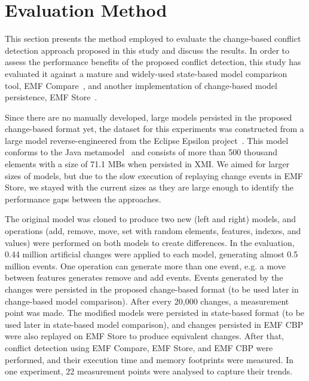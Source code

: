 \section{Evaluation Method}
\label{sec:evaluation_method}
This section presents the method employed to evaluate the change-based conflict detection approach proposed in this study and discuss the results. In order to assess the performance benefits of the proposed conflict detection, this study has evaluated it against a mature and widely-used state-based model comparison tool, EMF Compare~\cite{emfcompare2018developer,eclipse2017compare}, and another implementation of change-based model persistence, EMF Store~\cite{koegel2010emfstore}.

Since there are no manually developed, large models persisted in the proposed change-based format yet, the dataset for this experiments was constructed from a large model reverse-engineered from the Eclipse Epsilon project~\cite{eclipse2018epsilongit,eclipse2017epsilon}. This model conforms to the Java metamodel~\cite{eclipse2018modiscojava} and consists of more than 500 thousand elements with a size of 71.1 MBs when persisted in XMI. We aimed for larger sizes of models, but due to the slow execution of replaying change events in EMF Store, we stayed with the current sizes as they are large enough to identify the performance gaps between the approaches.

The original model was cloned to produce two new (left and right) models, and operations (\textsf{add}, \textsf{remove}, \textsf{move}, \textsf{set} with random elements, features, indexes, and values) were performed on both models to create differences. In the evaluation, 0.44 million artificial changes were applied to each model, generating almost 0.5 million events. One operation can generate more than one event, e.g. a \textsf{move} between features generates \textsf{remove} and \textsf{add} events. Events generated by the changes were persisted in the proposed change-based format (to be used later in change-based model comparison). After every 20,000 changes, a measurement point was made. The modified models were persisted in state-based format (to be used later in state-based model comparison), and changes persisted in EMF CBP were also replayed on EMF Store to produce equivalent changes. After that, conflict detection using EMF Compare, EMF Store, and EMF CBP were performed, and their execution time and memory footprints were measured. In one experiment, 22 measurement points were analysed to capture their trends.

